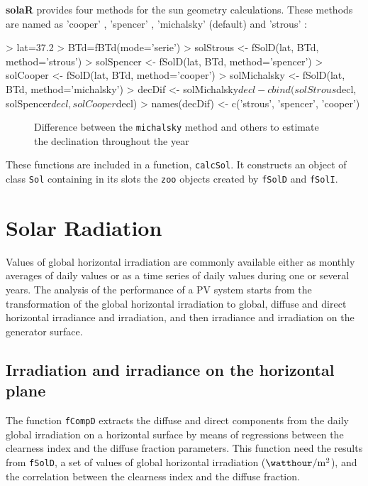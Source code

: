 \documentclass[a4paper]{article}
\renewenvironment{Schunk}{\vspace{\topsep}}{\vspace{\topsep}}
\newcommand{\code}[1]{{\texttt{#1}}}
\newcommand{\pkg}[1]{{\textbf{#1}}}
\begin{document}
\pkg{solaR} provides four methods for the sun geometry calculations. These
methods are named as 'cooper' \cite{Cooper1969}, 'spencer'
\cite{Spencer1971}, 'michalsky' (default) \cite{Michalsky1988} and
'strous' \cite{Strous2011}:

\begin{Schunk}
\begin{Sinput}
> lat=37.2
> BTd=fBTd(mode='serie')
> solStrous <- fSolD(lat, BTd, method='strous')
> solSpencer <- fSolD(lat, BTd, method='spencer')
> solCooper <- fSolD(lat, BTd, method='cooper')
> solMichalsky <- fSolD(lat, BTd, method='michalsky')
> decDif <- solMichalsky$decl - cbind(solStrous$decl, 
      solSpencer$decl, solCooper$decl)
> names(decDif) <- c('strous', 'spencer', 'cooper')
\end{Sinput}
\end{Schunk}

\begin{figure}
\begin{centering}
\par\end{centering}

\caption{Difference between the \texttt{michalsky} method and others
  to estimate the declination throughout the year\label{fig:Declinacion}}

\end{figure}

These functions are included in a function, \code{calcSol}.
It constructs an object of class \code{Sol} containing in
its slots the \code{zoo} objects created by \code{fSolD} and
\code{fSolI}.  



\section{Solar Radiation}

Values of global horizontal irradiation are commonly available either
as monthly averages of daily values or as a time series of daily
values during one or several years.  The analysis of the performance
of a PV system starts from the transformation of the global horizontal
irradiation to global, diffuse and direct horizontal irradiance and
irradiation, and then irradiance and irradiation on the generator
surface.


\subsection{Irradiation and irradiance on the horizontal plane}
\label{sec:horizontal}
The function \code{fCompD} extracts the diffuse and direct components
from the daily global irradiation on a horizontal surface by means of
regressions between the clearness index and the diffuse fraction
parameters.  This function need the results from \code{fSolD}, a set
of values of global horizontal irradiation
($\si{\watthour\per\meter\squared}$), and the correlation between the
clearness index and the diffuse fraction.  
\end{document}
